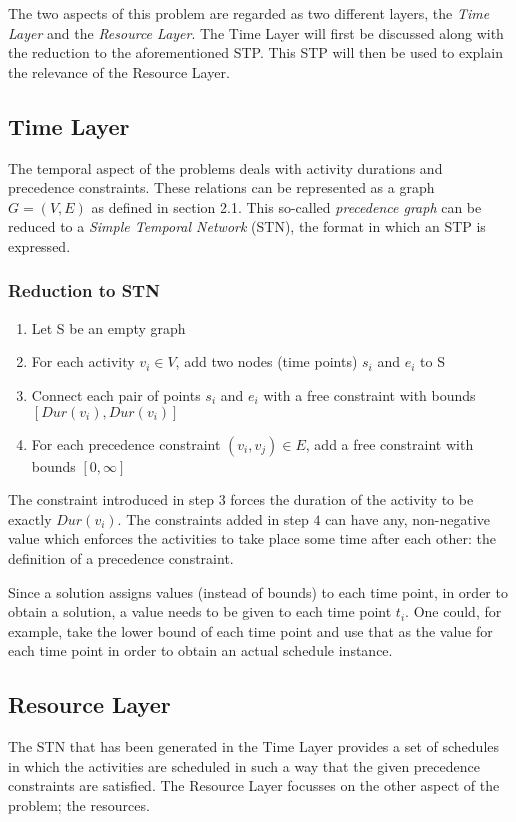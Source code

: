 \documentclass{article}
\newcommand{\dur}[1]{\ensuremath{Dur(v_{#1})}} %
\begin{document}
The two aspects of this problem are regarded as two different layers, the \emph{Time Layer} and the \emph{Resource Layer}.
The Time Layer will first be discussed along with the reduction to the aforementioned STP. 
This STP will then be used to explain the relevance of the Resource Layer.

\subsection{Time Layer}
The temporal aspect of the problems deals with activity durations and precedence constraints.
These relations can be represented as a graph $G=(V,E)$ as defined in section 2.1. 
This so-called \emph{precedence graph} can be reduced to a \emph{Simple Temporal Network} (STN), the format in which an STP is expressed.

\subsubsection{Reduction to STN}
\begin{enumerate}
\item Let S be an empty graph
\item For each activity $v_i \in V$, add two nodes (time points) $s_i$ and $e_i$ to S
\item Connect each pair of points $s_i$ and $e_i$ with a free constraint with bounds $[\dur{i}, \dur{i}]$
\item For each precedence constraint $(v_i, v_j) \in E$, add a free constraint with bounds $[0, \infty]$
\end{enumerate}

The constraint introduced in step $3$ forces the duration of the activity to be exactly \dur{i}. The constraints added in step $4$ can have any, non-negative value which enforces the activities to take place some time after each other: the definition of a precedence constraint.

Since a solution assigns values (instead of bounds) to each time point, in order to obtain a solution, a value needs to be given to each time point $t_i$.
One could, for example, take the lower bound of each time point and use that as the value for each time point in order to obtain an actual schedule instance.

\subsection{Resource Layer}
The STN that has been generated in the Time Layer provides a set of schedules in which the activities are scheduled in such a way that the given precedence constraints are satisfied. The Resource Layer focusses on the other aspect of the problem; the resources. 
\end{document}
